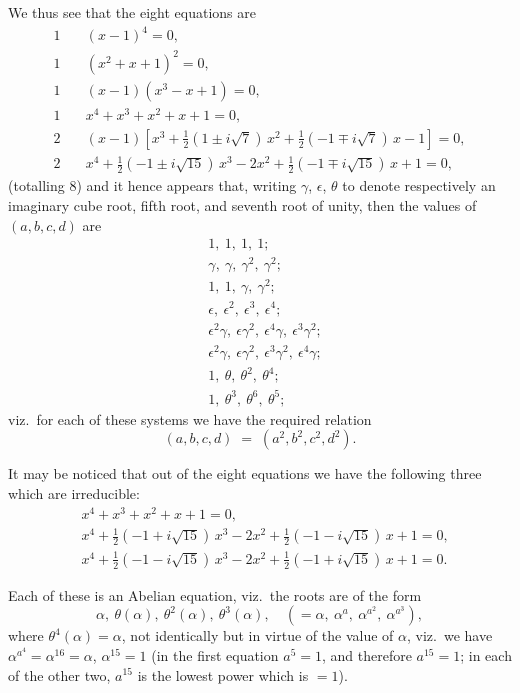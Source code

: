 \documentclass[11pt]{article}
\begin{document}
We thus see that the eight equations are
\begin{align*}
1\quad & (x-1)^4 = 0,\\
1\quad & (x^2+x+1)^2 = 0,\\
1\quad & (x-1)(x^3-x+1) = 0,\\
1\quad & x^4 + x^3 + x^2 + x + 1 = 0,\\
2\quad & (x-1)\!\left[x^3 + \tfrac{1}{2}(1 \pm i\sqrt{7})\,x^2 + \tfrac{1}{2}(-1 \mp i\sqrt{7})\,x - 1\right] = 0,\\
2\quad & x^4 + \tfrac{1}{2}(-1 \pm i\sqrt{15})\,x^3 - 2x^2 + \tfrac{1}{2}(-1 \mp i\sqrt{15})\,x + 1 = 0,
\end{align*}
\hfill (totalling 8)
and it hence appears that, writing $\gamma$, $\epsilon$, $\theta$ to denote respectively an imaginary cube root, fifth root, and seventh root of unity, then the values of $(a, b, c, d)$ are
\begin{align*}
& 1,\ 1,\ 1,\ 1;\\
& \gamma,\ \gamma,\ \gamma^2,\ \gamma^2;\\
& 1,\ 1,\ \gamma,\ \gamma^2;\\
& \epsilon,\ \epsilon^2,\ \epsilon^3,\ \epsilon^4;\\
& \epsilon^2\gamma,\ \epsilon\gamma^2,\ \epsilon^4\gamma,\ \epsilon^3\gamma^2;\\
& \epsilon^2\gamma,\ \epsilon\gamma^2,\ \epsilon^3\gamma^2,\ \epsilon^4\gamma;\\
& 1,\ \theta,\ \theta^2,\ \theta^4;\\
& 1,\ \theta^3,\ \theta^6,\ \theta^5;
\end{align*}
viz.\ for each of these systems we have the required relation
\[
(a, b, c, d) \;=\; (a^2, b^2, c^2, d^2).
\]

\medskip

It may be noticed that out of the eight equations we have the following three which are irreducible:
\begin{align*}
& x^4 + x^3 + x^2 + x + 1 = 0,\\
& x^4 + \tfrac{1}{2}(-1 + i\sqrt{15})\,x^3 - 2x^2 + \tfrac{1}{2}(-1 - i\sqrt{15})\,x + 1 = 0,\\
& x^4 + \tfrac{1}{2}(-1 - i\sqrt{15})\,x^3 - 2x^2 + \tfrac{1}{2}(-1 + i\sqrt{15})\,x + 1 = 0.
\end{align*}

\medskip

Each of these is an Abelian equation, viz.\ the roots are of the form
\[
\alpha,\ \theta(\alpha),\ \theta^2(\alpha),\ \theta^3(\alpha),\quad (= \alpha,\ \alpha^a,\ \alpha^{a^2},\ \alpha^{a^3}),
\]
where $\theta^4(\alpha) = \alpha$, not identically but in virtue of the value of $\alpha$, viz.\ we have $\alpha^{a^4} = \alpha^{16} = \alpha$, $\alpha^{15} = 1$ (in the first equation $a^5 = 1$, and therefore $a^{15} = 1$; in each of the other two, $a^{15}$ is the lowest power which is $=1$).
\end{document}
